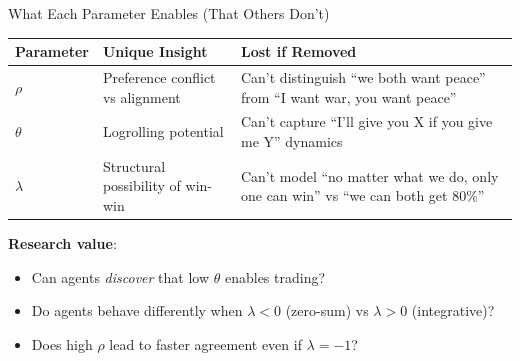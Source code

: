 \documentclass{beamer}
\begin{document}
\begin{frame}{What Each Parameter Enables (That Others Don't)}
\begin{center}
\small
\begin{tabular}{p{2cm}p{4cm}p{4cm}}
\hline
\textbf{Parameter} & \textbf{Unique Insight} & \textbf{Lost if Removed} \\
\hline
$\rho$ & Preference conflict vs alignment & Can't distinguish ``we both want peace'' from ``I want war, you want peace'' \\
\hline
$\theta$ & Logrolling potential & Can't capture ``I'll give you X if you give me Y'' dynamics \\
\hline
$\lambda$ & Structural possibility of win-win & Can't model ``no matter what we do, only one can win'' vs ``we can both get 80\%'' \\
\hline
\end{tabular}
\end{center}

\vspace{0.5cm}

\textbf{Research value}:
\begin{itemize}
    \item Can agents \textit{discover} that low $\theta$ enables trading?
    \item Do agents behave differently when $\lambda < 0$ (zero-sum) vs $\lambda > 0$ (integrative)?
    \item Does high $\rho$ lead to faster agreement even if $\lambda = -1$?
\end{itemize}
\end{frame}
\end{document}
